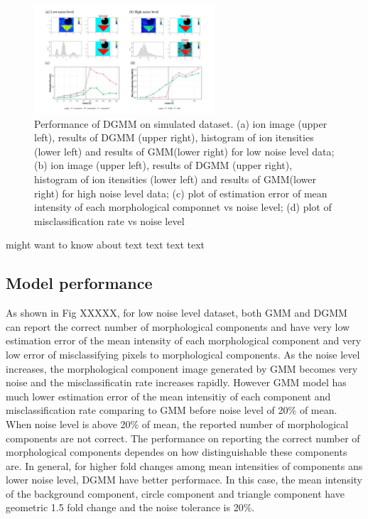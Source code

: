 \documentclass{bioinfo}
\begin{document}
\begin{figure}[b!]
    \centering
	\includegraphics[width=0.6\textwidth]{figure4.jpg}
    \caption{Performance of DGMM on simulated dataset. (a) ion image (upper left), results of DGMM (upper right), histogram of ion itensities (lower left) and results of GMM(lower right) for low noise level data; (b) ion image (upper left), results of DGMM (upper right), histogram of ion itensities (lower left) and results of GMM(lower right) for high noise level data; (c) plot of estimation error of mean intensity of each morphological componnet vs noise level; (d) plot of misclassification rate vs noise level}
    \label{fig:figure4}
\end{figure}
\citealp{Boffelli03} might want to know about text text text
text\vspace*{1pt}



\subsection{Model performance}

As shown in Fig XXXXX, for low noise level dataset, both GMM and DGMM can report the correct number of morphological components and have very low estimation error of the mean intensity of each morphological component and very low error of misclassifying pixels to morphological components. As the noise level increases, the morphological component image generated by GMM becomes very noise and the misclassificatin rate increases rapidly. However GMM model has much lower estimation error of the mean intensitiy of each component and misclassification rate comparing to GMM before noise level of 20\% of mean. When noise level is above 20\% of mean, the reported number of morphological components are not correct. The performance on reporting the correct number of morphological components dependes on how distinguishable these components are. In general, for higher fold changes among mean intensities of components ans lower noise level, DGMM have better performace. In this case, the mean intensity of the background component,  circle component and triangle component have geometric 1.5 fold change and the noise tolerance is 20\%.
\end{document}
